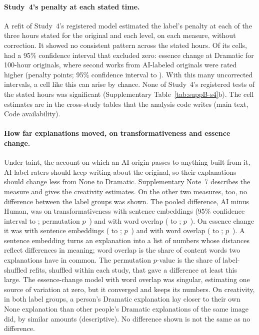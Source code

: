 \paragraph*{Study~4's penalty at each stated time.}
A refit of Study~4's registered model estimated the label's penalty at each of the three hours stated for the original and each level, on each measure, without correction. It showed no consistent pattern across the stated hours. Of its \XSTimeCheckSFourNCells{} cells, \XSTimeCheckSFourNExcludeZero{} had a 95\% confidence interval that excluded zero: essence change at Dramatic for 100-hour originals, where second works from AI-labeled originals were rated higher (penalty \XSTimeCheckSFourEssPenaltyHundredHoursDramaticEst{} points; 95\% confidence interval \XSTimeCheckSFourEssPenaltyHundredHoursDramaticLo{} to \XSTimeCheckSFourEssPenaltyHundredHoursDramaticHi). With this many uncorrected intervals, a cell like this can arise by chance. None of Study~4's registered tests of the stated hours was significant (Supplementary Table~\ref{tab:suppB-s4}b). The cell estimates are in the cross-study tables that the analysis code writes (main text, Code availability).

\paragraph*{How far explanations moved, on transformativeness and essence change.}
Under taint, the account on which an AI origin passes to anything built from it, AI-label raters should keep writing about the original, so their explanations should change less from None to Dramatic. Supplementary Note~7 describes the measure and gives the creativity estimates. On the other two measures, too, no difference between the label groups was shown. The pooled difference, AI minus Human, was \XSTransShiftEmbEst{} on transformativeness with sentence embeddings (95\% confidence interval \XSTransShiftEmbLo{} to \XSTransShiftEmbHi; permutation $p$~\XSTransShiftEmbPPerm) and \XSTransShiftWordEst{} with word overlap (\XSTransShiftWordLo{} to \XSTransShiftWordHi; $p$~\XSTransShiftWordPPerm). On essence change it was \XSEssShiftEmbEst{} with sentence embeddings (\XSEssShiftEmbLo{} to \XSEssShiftEmbHi; $p$~\XSEssShiftEmbPPerm) and \XSEssShiftWordEst{} with word overlap (\XSEssShiftWordLo{} to \XSEssShiftWordHi; $p$~\XSEssShiftWordPPerm). A sentence embedding turns an explanation into a list of numbers whose distances reflect differences in meaning; word overlap is the share of content words two explanations have in common. The permutation $p$-value is the share of label-shuffled refits, shuffled within each study, that gave a difference at least this large. The essence-change model with word overlap was singular, estimating one source of variation at zero, but it converged and keeps its numbers. On creativity, in both label groups, a person's Dramatic explanation lay closer to their own None explanation than other people's Dramatic explanations of the same image did, by similar amounts (descriptive). No difference shown is not the same as no difference.

